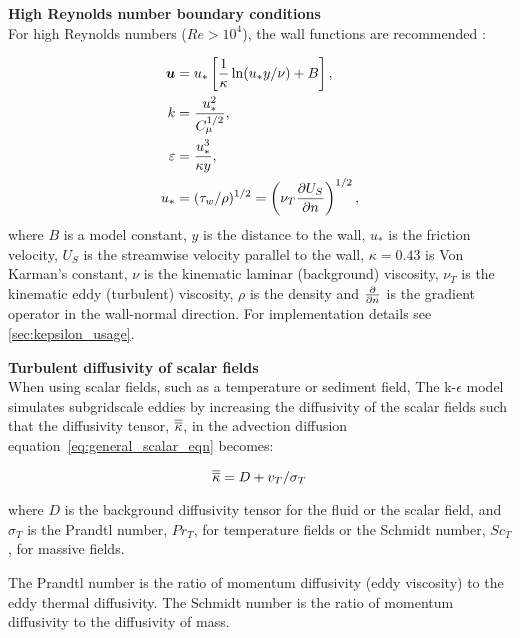 \par{\textbf{High Reynolds number boundary conditions}\\}
For high Reynolds numbers ($Re>10^4$), the  wall functions are recommended \citep{wilcox1998turbulence}:

\begin{align}
\bmu &= u_* \left [ \frac{1}{\kappa} \ln (u_* y / \nu) + B \right ], \label{eq:ubc2}\\
k &= \frac{u_*^2}{C_{\mu}^{1/2}}, \label{eq:kbc2}\\
\epsilon &= \frac{u_*^3}{\kappa y}, \label{eq:epsbc2}\\
u_* &= (\tau_w / \rho)^{1/2} = \left ( \nu_T \ppx[n]{U_S} \right )^{1/2}, \label{eq:ustar}
\end{align}
where $B$ is a model constant, $y$ is the distance to the wall, $u_*$ is the friction
velocity, $U_S$ is the streamwise velocity parallel to the wall, $\kappa=0.43$ is Von
Karman's constant, $\nu$ is the kinematic laminar (background) viscosity, $\nu_T$ is the
kinematic eddy (turbulent) viscosity, $\rho$ is the density and $\ppx[n]{}$ is the
gradient operator in the wall-normal direction. For implementation details see
\ref{sec:kepsilon_usage}.

\par{\textbf{Turbulent diffusivity of scalar fields}\\}
When using scalar fields, such as a temperature or sediment field, The k-$\epsilon$ model
simulates subgridscale eddies by increasing the diffusivity  of the scalar fields such
that the diffusivity tensor, $\kaptens$, in the advection diffusion equation~\ref{eq:general_scalar_eqn} becomes:

\begin{equation}\label{eq:keps_diff}
\kaptens = D + v_T/\sigma_T
\end{equation}

where $D$ is the background diffusivity tensor for the fluid or the scalar field, and
$\sigma_T$ is the Prandtl number, $Pr_T$, for temperature fields or the Schmidt number, $Sc_T$,
for massive fields.  

The Prandtl number is the ratio of momentum diffusivity (eddy viscosity) to the eddy
thermal diffusivity. The Schmidt number is the ratio of momentum diffusivity to the
diffusivity of mass. 

